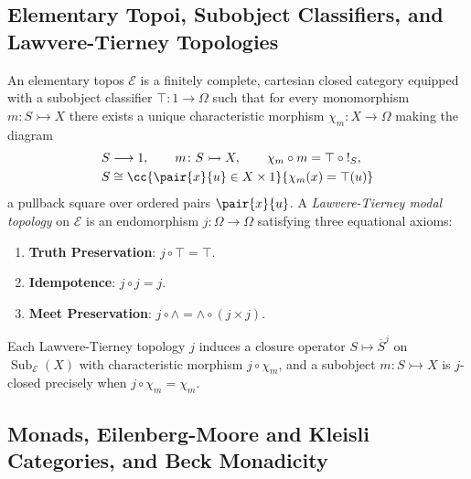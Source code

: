 \subsection{Elementary Topoi, Subobject Classifiers, and Lawvere-Tierney Topologies}
\label{subsec:topos_subobject_classifier_lawvere_tierney}

An elementary topos $\mathcal{E}$ is a finitely complete, cartesian closed category equipped with a subobject classifier $\top\colon 1 \to \Omega$ such that for every monomorphism $m\colon S \rightarrowtail X$ there exists a unique characteristic morphism $\chi_m\colon X \to \Omega$ making the diagram
\[
\begin{aligned}
S &\longrightarrow 1, \qquad m\colon S \rightarrowtail X, \qquad \chi_m \circ m = \top \circ {!_S}, \\
S &\cong \cc{\pair{x}{u} \in X \times 1}{\chi_m(x) = \top(u)}
\end{aligned}
\]
a pullback square over ordered pairs $\pair{x}{u}$. A \emph{Lawvere-Tierney modal topology} on $\mathcal{E}$ is an endomorphism $j\colon \Omega \to \Omega$ satisfying three equational axioms:
\begin{enumerate}
  \item \textbf{Truth Preservation}: $j \circ \top = \top$.
  \item \textbf{Idempotence}: $j \circ j = j$.
  \item \textbf{Meet Preservation}: $j \circ \wedge = \wedge \circ (j \times j)$.
\end{enumerate}
Each Lawvere-Tierney topology $j$ induces a closure operator $S \mapsto \overline{S}^j$ on $\operatorname{Sub}_{\mathcal{E}}(X)$ with characteristic morphism $j \circ \chi_m$, and a subobject $m\colon S \rightarrowtail X$ is $j$-closed precisely when $j \circ \chi_m = \chi_m$.

\subsection{Monads, Eilenberg-Moore and Kleisli Categories, and Beck Monadicity}
\label{subsec:monads_eilenberg_moore_kleisli_beck}

